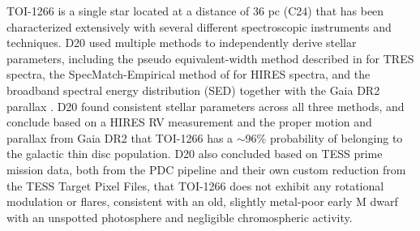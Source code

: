 \documentclass[twocolumn]{aastex631}
\begin{document}
TOI-1266 is a single star located at a distance of 36 pc (C24) that has been characterized extensively with several different spectroscopic instruments and techniques. D20 used multiple methods to independently derive stellar parameters, including the pseudo equivalent-width method described in \cite{Maldonado2015} for TRES spectra, the SpecMatch-Empirical method of \cite{Yee2017} for HIRES spectra, and the broadband spectral energy distribution (SED) together with the Gaia DR2 parallax \citep{Stassun2016,Stassun2017,Stassun2018}. D20 found consistent stellar parameters across all three methods, and conclude based on a HIRES RV measurement and the proper motion and parallax from Gaia DR2 that TOI-1266 has a $\sim$96\% probability of belonging to the galactic thin disc population. D20 also concluded based on TESS prime mission data, both from the PDC pipeline and their own custom reduction from the TESS Target Pixel Files, that TOI-1266 does not exhibit any rotational modulation or flares, consistent with an old, slightly metal-poor early M dwarf with an unspotted photosphere and negligible chromospheric activity. 
\end{document}
